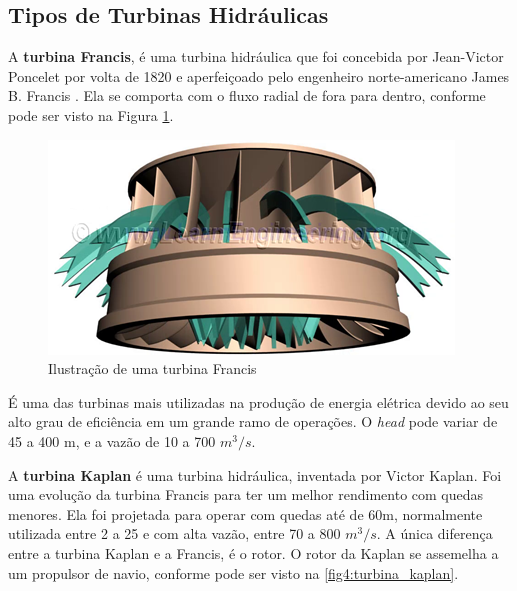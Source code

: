 \subsection{Tipos de Turbinas Hidráulicas}


A \textbf{turbina Francis}, é uma turbina hidráulica que foi concebida por Jean-Victor Poncelet por volta de 1820 e aperfeiçoado pelo engenheiro norte-americano James B. Francis \cite{turbina_francis}. Ela se comporta com o fluxo radial de fora para dentro, conforme pode ser visto na Figura \ref{fig3:turbina_francis}.

    \begin{figure}[htb]
        \centering
        \caption {\label{fig3:turbina_francis} Ilustração de uma turbina Francis}
        \includegraphics[scale=0.8]{images/fig3.png}
    \end{figure}

    É uma das turbinas mais utilizadas na produção de energia elétrica devido ao seu alto grau de eficiência em um grande ramo de operações. O \textit{head} pode variar de 45 a 400 m, e a vazão de 10 a 700 $m^3/s$. \cite{francis_turbine}


    A \textbf{turbina Kaplan} é uma turbina hidráulica, inventada por Victor Kaplan. Foi uma evolução da turbina Francis para ter um melhor rendimento com quedas menores. Ela foi projetada para operar com quedas até de 60m, normalmente utilizada entre 2 a 25 e com alta vazão, entre 70 a 800 $m^3/s$. A única diferença entre a turbina Kaplan e a Francis, é o rotor. O rotor da Kaplan se assemelha a um propulsor de navio, conforme pode ser visto na  \autoref{fig4:turbina_kaplan}.


